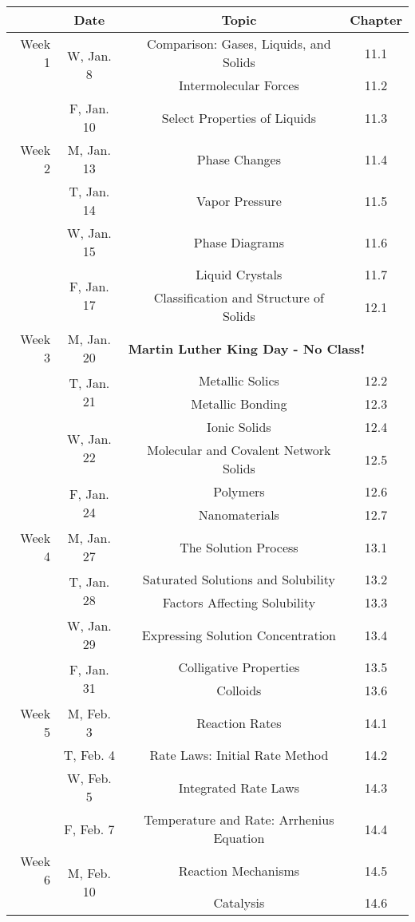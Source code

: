 \begin{tabular}{rcccc}
& Date && Topic & Chapter\\
\midrule
Week 1 & \multirow{2}{*}{W, Jan. 8}& & Comparison: Gases, Liquids, and Solids & 11.1\\
& & & Intermolecular Forces & 11.2\\
& F, Jan. 10&& Select Properties of Liquids & 11.3\\
\midrule
Week 2 & M, Jan. 13&& Phase Changes & 11.4\\
& T, Jan. 14&& Vapor Pressure & 11.5\\
& W, Jan. 15&& Phase Diagrams & 11.6\\
& \multirow{2}{*}{F, Jan. 17}& & Liquid Crystals & 11.7\\
& & & Classification and Structure of Solids & 12.1\\
\midrule
Week 3 & M, Jan. 20& \multicolumn{3}{l}{\textbf{Martin Luther King Day - No Class!}}\\
& \multirow{2}{*}{T, Jan. 21}& & Metallic Solics & 12.2\\
& & & Metallic Bonding & 12.3\\
& \multirow{2}{*}{W, Jan. 22}& & Ionic Solids & 12.4\\
& & & Molecular and Covalent Network Solids & 12.5\\
& \multirow{2}{*}{F, Jan. 24}& & Polymers & 12.6\\
& & & Nanomaterials & 12.7\\
\midrule
Week 4 & M, Jan. 27&& The Solution Process & 13.1\\
& \multirow{2}{*}{T, Jan. 28}& & Saturated Solutions and Solubility & 13.2\\
& & & Factors Affecting Solubility & 13.3\\
& W, Jan. 29&& Expressing Solution Concentration & 13.4\\
& \multirow{2}{*}{F, Jan. 31}& & Colligative Properties & 13.5\\
& & & Colloids & 13.6\\
\midrule
Week 5 & M, Feb. 3&& Reaction Rates & 14.1\\
& T, Feb. 4&& Rate Laws: Initial Rate Method & 14.2\\
& W, Feb. 5&& Integrated Rate Laws & 14.3\\
& F, Feb. 7&& Temperature and Rate: Arrhenius Equation & 14.4\\
\midrule
Week 6 & \multirow{2}{*}{M, Feb. 10}& & Reaction Mechanisms & 14.5\\
& & & Catalysis & 14.6\\

\end{tabular}
